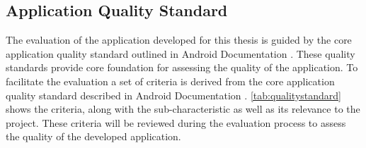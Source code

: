 \subsection{Application Quality Standard}
The evaluation of the application developed for this thesis is guided by the core application quality standard outlined in Android Documentation \autocite{androidqualityguidelines}. These quality standards provide core foundation for assessing the quality of the application. 
To facilitate the evaluation a set of criteria is derived from the core application quality standard described in Android Documentation \autocite{androidqualityguidelines}. \autoref{tab:qualitystandard} shows the criteria, along with the sub-characteristic as well as its relevance to the project. These criteria will be reviewed during the evaluation process to assess the quality of the developed application.
